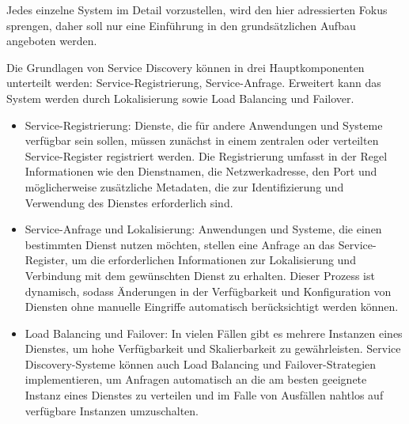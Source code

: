 Jedes einzelne System im Detail vorzustellen, wird den hier adressierten Fokus sprengen, daher soll nur eine Einführung in den grundsätzlichen Aufbau angeboten werden. 

Die Grundlagen von Service Discovery können in drei Hauptkomponenten unterteilt werden: Service-Registrierung, Service-Anfrage. Erweitert kann das System werden durch Lokalisierung sowie Load Balancing und Failover.
\begin{itemize}
\item Service-Registrierung: Dienste, die für andere Anwendungen und Systeme verfügbar sein sollen, müssen zunächst in einem zentralen oder verteilten Service-Register registriert werden. Die Registrierung umfasst in der Regel Informationen wie den Dienstnamen, die Netzwerkadresse, den Port und möglicherweise zusätzliche Metadaten, die zur Identifizierung und Verwendung des Dienstes erforderlich sind.
\item Service-Anfrage und Lokalisierung: Anwendungen und Systeme, die einen bestimmten Dienst nutzen möchten, stellen eine Anfrage an das Service-Register, um die erforderlichen Informationen zur Lokalisierung und Verbindung mit dem gewünschten Dienst zu erhalten. Dieser Prozess ist dynamisch, sodass Änderungen in der Verfügbarkeit und Konfiguration von Diensten ohne manuelle Eingriffe automatisch berücksichtigt werden können.
\item Load Balancing und Failover: In vielen Fällen gibt es mehrere Instanzen eines Dienstes, um hohe Verfügbarkeit und Skalierbarkeit zu gewährleisten. Service Discovery-Systeme können auch Load Balancing und Failover-Strategien implementieren, um Anfragen automatisch an die am besten geeignete Instanz eines Dienstes zu verteilen und im Falle von Ausfällen nahtlos auf verfügbare Instanzen umzuschalten.
\end{itemize}    

